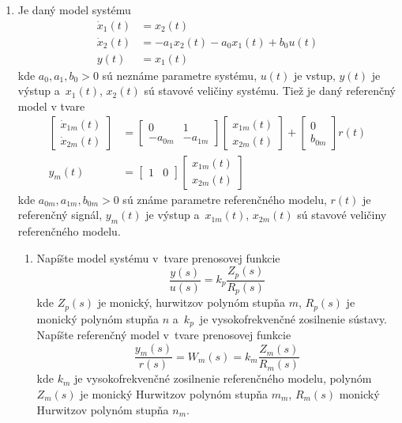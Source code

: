 \documentclass[a4paper, 10pt, ]{article}
\begin{document}
\begin{enumerate}[leftmargin=0pt, labelsep=4mm, itemsep=0pt]



    \item Je daný model systému
    \begin{align*}
        \dot{x}_1(t) &= x_2(t) \\
        \dot{x}_2(t) &= -a_1 x_2(t) - a_0 x_1(t) + b_0 u(t) \\
        y(t) & = x_1(t)
    \end{align*}
    kde $a_0, a_1, b_0 > 0$ sú neznáme parametre systému, $u(t)$ je vstup, $y(t)$ je výstup a~$x_1(t)$, $x_2(t)$ sú stavové veličiny systému. Tiež je daný referenčný model v tvare
    \begin{align*}
        \begin{bmatrix} \dot{x}_{1m}(t) \\ \dot{x}_{2m}(t) \end{bmatrix}
        &=
        \begin{bmatrix} 0 & 1 \\ -a_{0m} & -a_{1m} \end{bmatrix}
        \begin{bmatrix} x_{1m}(t)  \\ x_{2m}(t) \end{bmatrix}
        +
        \begin{bmatrix} 0  \\  b_{0m} \end{bmatrix}
        r(t) \\
        y_m(t) &= \begin{bmatrix} 1 & 0 \end{bmatrix}
        \begin{bmatrix} x_{1m}(t) \\ x_{2m}(t) \end{bmatrix}
    \end{align*}
    kde $a_{0m}, a_{1m}, b_{0m} > 0$ sú známe parametre referenčného modelu, $r(t)$ je referenčný signál, $y_m(t)$ je výstup a~$x_{1m}(t)$, $x_{2m}(t)$ sú stavové veličiny referenčného modelu.
    \begin{enumerate}[leftmargin=0pt, labelsep=4mm, itemsep=0pt]
        \item Napíšte model systému v~tvare prenosovej funkcie \label{odvodtePrenosFcn}
        \begin{equation*}
            \frac{y(s)}{u(s)} = k_p \frac{Z_p(s)}{R_p(s)}
        \end{equation*}
        kde $Z_p(s)$ je monický, hurwitzov polynóm stupňa $m$, $R_p(s)$ je monický polynóm stupňa $n$ a~$k_p$~je vysokofrekvenčné zosilnenie sústavy. Napíšte referenčný model v~tvare prenosovej funkcie
        \begin{equation*}
            \frac{y_m(s)}{r(s)} = W_m(s) = k_m \frac{Z_m(s)}{R_m(s)}
        \end{equation*}
        kde $k_m$ je vysokofrekvenčné zosilnenie referenčného modelu, polynóm $Z_m(s)$ je monický Hurwitzov polynóm stupňa $m_m$, $R_m(s)$ monický Hurwitzov polynóm stupňa $n_m$.


\end{enumerate}
\end{enumerate}
\end{document}
